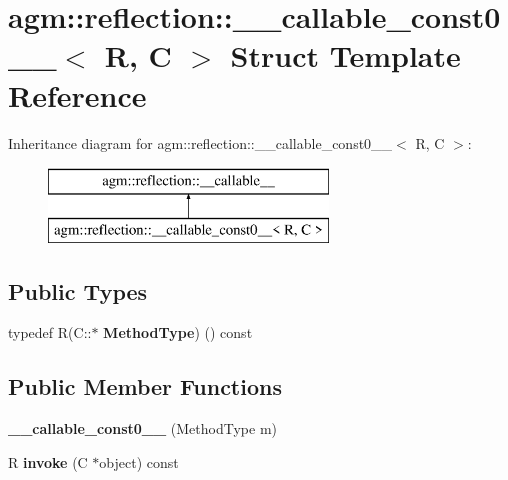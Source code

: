 \hypertarget{structagm_1_1reflection_1_1____callable__const0____}{}\section{agm\+:\+:reflection\+:\+:\+\_\+\+\_\+callable\+\_\+const0\+\_\+\+\_\+$<$ R, C $>$ Struct Template Reference}
\label{structagm_1_1reflection_1_1____callable__const0____}
Inheritance diagram for agm\+:\+:reflection\+:\+:\+\_\+\+\_\+callable\+\_\+const0\+\_\+\+\_\+$<$ R, C $>$\+:\begin{figure}[H]
\begin{center}
\leavevmode
\includegraphics[height=2.000000cm]{structagm_1_1reflection_1_1____callable__const0____}
\end{center}
\end{figure}
\subsection*{Public Types}
\begin{DoxyCompactItemize}
\item 
typedef R(C\+::$\ast$ {\bfseries Method\+Type}) () const \hypertarget{structagm_1_1reflection_1_1____callable__const0_____ab270412dfba35616a20d9a8436b8b36e}{}\label{structagm_1_1reflection_1_1____callable__const0_____ab270412dfba35616a20d9a8436b8b36e}

\end{DoxyCompactItemize}
\subsection*{Public Member Functions}
\begin{DoxyCompactItemize}
\item 
{\bfseries \+\_\+\+\_\+callable\+\_\+const0\+\_\+\+\_\+} (Method\+Type m)\hypertarget{structagm_1_1reflection_1_1____callable__const0_____a4c028e2e3d6e870fe38a4743d6ee51f7}{}\label{structagm_1_1reflection_1_1____callable__const0_____a4c028e2e3d6e870fe38a4743d6ee51f7}

\item 
R {\bfseries invoke} (C $\ast$object) const \hypertarget{structagm_1_1reflection_1_1____callable__const0_____ab4b08efbdcfc68a8738420f0815e22d9}{}\label{structagm_1_1reflection_1_1____callable__const0_____ab4b08efbdcfc68a8738420f0815e22d9}

\end{DoxyCompactItemize}
